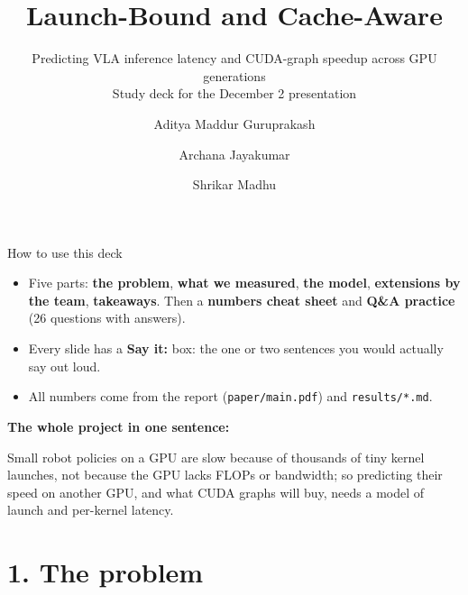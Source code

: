 \documentclass[aspectratio=169,10pt]{beamer}
\title{Launch-Bound and Cache-Aware}
\subtitle{Predicting VLA inference latency and CUDA-graph speedup across GPU generations\\[0.4em]
\small Study deck for the December 2 presentation}
\author{Aditya Maddur Guruprakash \and Archana Jayakumar \and Shrikar Madhu}
\institute{NYU, GPU Architecture and Programming, Fall 2026, Project 2 (flavor B)}
\date{}
\begin{document}
\begin{frame}[plain]\titlepage\end{frame}

\begin{frame}{How to use this deck}
\begin{itemize}
\item Five parts: \textbf{the problem}, \textbf{what we measured}, \textbf{the model},
  \textbf{extensions by the team}, \textbf{takeaways}. Then a \textbf{numbers cheat sheet} and
  \textbf{Q\&A practice} (26 questions with answers).
\item Every slide has a \colorbox{soft}{\small\textbf{\textcolor{accent}{Say it:}}} box: the one or
  two sentences you would actually say out loud.
\item All numbers come from the report (\texttt{paper/main.pdf}) and \texttt{results/*.md}.
\end{itemize}
\vspace{1em}
\textbf{The whole project in one sentence:}
\begin{center}\begin{minipage}{0.85\textwidth}\centering\large
Small robot policies on a GPU are slow because of \alert{thousands of tiny kernel launches},
not because the GPU lacks FLOPs or bandwidth; so predicting their speed on another GPU, and
what CUDA graphs will buy, needs a model of \alert{launch and per-kernel latency}.
\end{minipage}\end{center}
\end{frame}

\section{1. The problem}
\end{document}
